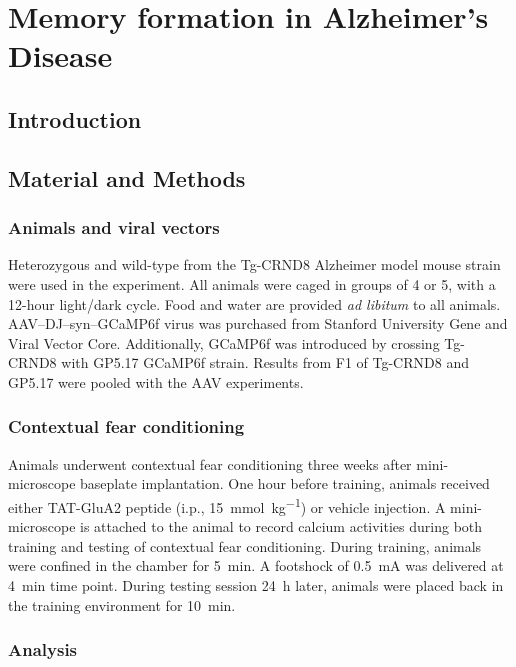 \chapter{Memory formation in Alzheimer's Disease}
\section{Introduction}

\section{Material and Methods}

\subsection{Animals and viral vectors}

Heterozygous and wild-type from the Tg-CRND8 Alzheimer model mouse strain were used in the experiment. All animals were caged in groups of 4 or 5, with a 12-hour light/dark cycle. Food and water are provided \textit{ad libitum} to all animals. AAV--DJ--syn--GCaMP6f virus was purchased from Stanford University Gene and Viral Vector Core. Additionally, GCaMP6f was introduced by crossing Tg-CRND8 with GP5.17 GCaMP6f strain. Results from F1 of Tg-CRND8 and GP5.17 were pooled with the AAV experiments.

\subsection{Contextual fear conditioning}

Animals underwent contextual fear conditioning three weeks after mini-microscope baseplate implantation. One hour before training, animals received either TAT-GluA2 peptide (i.p., \SI{15}{\mmol\per\kg}) or vehicle injection. A mini-microscope is attached to the animal to record calcium activities during both training and testing of contextual fear conditioning. During training, animals were confined in the chamber for \SI{5}{\minute}. A footshock of \SI{0.5}{\mA} was delivered at \SI{4}{\minute} time point. During testing session \SI{24}{\hour} later, animals were placed back in the training environment for \SI{10}{\minute}. 

\subsection{Analysis}

